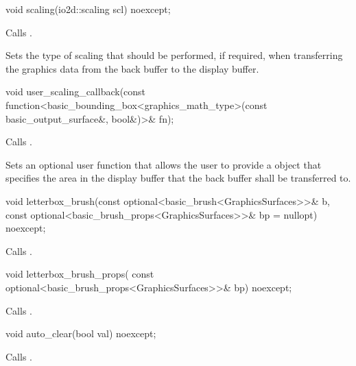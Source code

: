 %
\begin{itemdecl}
void scaling(io2d::scaling scl) noexcept;
\end{itemdecl}
\begin{itemdescr}
\pnum
\effects Calls .

\pnum
\remarks Sets the type of scaling that should be performed, if required, when transferring the graphics data from the back buffer to the display buffer.
\end{itemdescr}

%
\begin{itemdecl}
void user_scaling_callback(const
  function<basic_bounding_box<graphics_math_type>(const basic_output_surface&, bool&)>& fn);
\end{itemdecl}
\begin{itemdescr}
\pnum
\effects Calls .

\pnum
\remarks Sets an optional user function that allows the user to provide a  object that specifies the area in the display buffer that the back buffer shall be transferred to.
\end{itemdescr}

%
\begin{itemdecl}
void letterbox_brush(const optional<basic_brush<GraphicsSurfaces>>& b,
  const optional<basic_brush_props<GraphicsSurfaces>>& bp = nullopt) noexcept;
\end{itemdecl}
\begin{itemdescr}
\pnum
\effects Calls .
\end{itemdescr}

%
\begin{itemdecl}
void letterbox_brush_props(
  const optional<basic_brush_props<GraphicsSurfaces>>& bp) noexcept;
\end{itemdecl}
\begin{itemdescr}
\pnum
\effects Calls .
\end{itemdescr}

%
\begin{itemdecl}
void auto_clear(bool val) noexcept;
\end{itemdecl}
\begin{itemdescr}
\pnum
\effects Calls .
\end{itemdescr}

